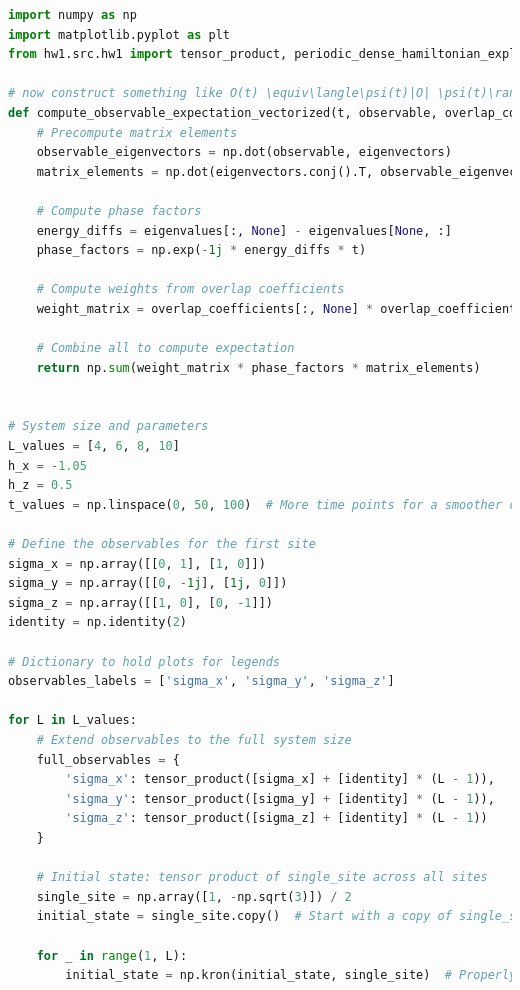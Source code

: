 \documentclass[12pt]{article}
\begin{document}
\begin{lstlisting}[language=Python]
import numpy as np
import matplotlib.pyplot as plt
from hw1.src.hw1 import tensor_product, periodic_dense_hamiltonian_explicit

# now construct something like O(t) \equiv\langle\psi(t)|O| \psi(t)\rangle & =\sum_{m, n} c_{m}^{*} c_{n} e^{-i\left(\varepsilon_{n}-\varepsilon_{m}\right) t}\langle m|O| n\rangle  \tag{3}\\
def compute_observable_expectation_vectorized(t, observable, overlap_coefficients, eigenvalues, eigenvectors):
    # Precompute matrix elements
    observable_eigenvectors = np.dot(observable, eigenvectors)
    matrix_elements = np.dot(eigenvectors.conj().T, observable_eigenvectors)
    
    # Compute phase factors
    energy_diffs = eigenvalues[:, None] - eigenvalues[None, :]
    phase_factors = np.exp(-1j * energy_diffs * t)
    
    # Compute weights from overlap coefficients
    weight_matrix = overlap_coefficients[:, None] * overlap_coefficients.conj()[None, :]
    
    # Combine all to compute expectation
    return np.sum(weight_matrix * phase_factors * matrix_elements)


# System size and parameters
L_values = [4, 6, 8, 10]
h_x = -1.05
h_z = 0.5
t_values = np.linspace(0, 50, 100)  # More time points for a smoother curve

# Define the observables for the first site
sigma_x = np.array([[0, 1], [1, 0]])
sigma_y = np.array([[0, -1j], [1j, 0]])
sigma_z = np.array([[1, 0], [0, -1]])
identity = np.identity(2)

# Dictionary to hold plots for legends
observables_labels = ['sigma_x', 'sigma_y', 'sigma_z']

for L in L_values:
    # Extend observables to the full system size
    full_observables = {
        'sigma_x': tensor_product([sigma_x] + [identity] * (L - 1)),
        'sigma_y': tensor_product([sigma_y] + [identity] * (L - 1)),
        'sigma_z': tensor_product([sigma_z] + [identity] * (L - 1))
    }
    
    # Initial state: tensor product of single_site across all sites
    single_site = np.array([1, -np.sqrt(3)]) / 2
    initial_state = single_site.copy()  # Start with a copy of single_site

    for _ in range(1, L):
        initial_state = np.kron(initial_state, single_site)  # Properly extending to the full system size


\end{lstlisting}
\end{document}
